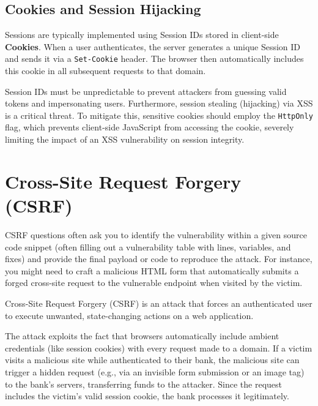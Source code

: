 \subsection{Cookies and Session Hijacking}
Sessions are typically implemented using Session IDs stored in client-side \textbf{Cookies}. When a user authenticates, the server generates a unique Session ID and sends it via a \texttt{Set-Cookie} header. The browser then automatically includes this cookie in all subsequent requests to that domain.

Session IDs must be unpredictable to prevent attackers from guessing valid tokens and impersonating users. Furthermore, session stealing (hijacking) via XSS is a critical threat. To mitigate this, sensitive cookies should employ the \texttt{HttpOnly} flag, which prevents client-side JavaScript from accessing the cookie, severely limiting the impact of an XSS vulnerability on session integrity.

\section{Cross-Site Request Forgery (CSRF)}
\begin{tcolorbox}[colback=blue!5!white,colframe=blue!75!black,title=Exam Insight]
CSRF questions often ask you to identify the vulnerability within a given source code snippet (often filling out a vulnerability table with lines, variables, and fixes) and provide the final payload or code to reproduce the attack. For instance, you might need to craft a malicious HTML form that automatically submits a forged cross-site request to the vulnerable endpoint when visited by the victim.
\end{tcolorbox}
Cross-Site Request Forgery (CSRF) is an attack that forces an authenticated user to execute unwanted, state-changing actions on a web application.

The attack exploits the fact that browsers automatically include ambient credentials (like session cookies) with every request made to a domain. If a victim visits a malicious site while authenticated to their bank, the malicious site can trigger a hidden request (e.g., via an invisible form submission or an image tag) to the bank's servers, transferring funds to the attacker. Since the request includes the victim's valid session cookie, the bank processes it legitimately.

